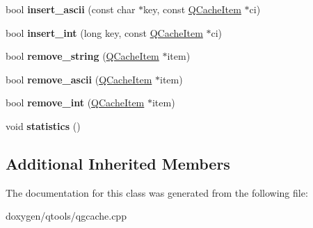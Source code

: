 \begin{DoxyCompactItemize}
\item 
\mbox{\label{class_q_c_dict_a70354f27a67f1330f3595f6e00e0812a}} 
bool {\bfseries insert\+\_\+ascii} (const char $\ast$key, const \mbox{\hyperlink{struct_q_cache_item}{Q\+Cache\+Item}} $\ast$ci)
\item 
\mbox{\label{class_q_c_dict_ac3205f0d5dc413aacc2a01a098c83654}} 
bool {\bfseries insert\+\_\+int} (long key, const \mbox{\hyperlink{struct_q_cache_item}{Q\+Cache\+Item}} $\ast$ci)
\item 
\mbox{\label{class_q_c_dict_a392034a09390df5604850cb669e2d31e}} 
bool {\bfseries remove\+\_\+string} (\mbox{\hyperlink{struct_q_cache_item}{Q\+Cache\+Item}} $\ast$item)
\item 
\mbox{\label{class_q_c_dict_a693694c9d0e0d4fa0038b7f3c82f5593}} 
bool {\bfseries remove\+\_\+ascii} (\mbox{\hyperlink{struct_q_cache_item}{Q\+Cache\+Item}} $\ast$item)
\item 
\mbox{\label{class_q_c_dict_a47cf97e51d230b9786f8523ecf1ca8f6}} 
bool {\bfseries remove\+\_\+int} (\mbox{\hyperlink{struct_q_cache_item}{Q\+Cache\+Item}} $\ast$item)
\item 
\mbox{\label{class_q_c_dict_ade0bd3f21028f74f1ef89f3d00244d10}} 
void {\bfseries statistics} ()
\end{DoxyCompactItemize}
\subsection*{Additional Inherited Members}


The documentation for this class was generated from the following file\+:\begin{DoxyCompactItemize}
\item 
doxygen/qtools/qgcache.\+cpp\end{DoxyCompactItemize}
